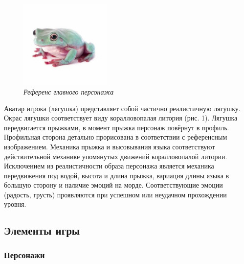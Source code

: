 \documentclass{article}
\begin{document}
\begin{figure}
    \centering
    \includegraphics[width=0.4\textwidth]{pictures/photo_2024-12-01_22-21-33.jpg}
    \caption{\textit {Референс главного персонажа}}
    \label{fig:example}
\end{figure} 
Аватар игрока (лягушка) представляет собой частично реалистичную лягушку. Окрас лягушки соответствует виду коралловопалая литория (рис. 1).  Лягушка передвигается прыжками, в  момент прыжка персонаж повёрнут в профиль. Профильная сторона детально прорисована в соответствии с референсным изображением. Механика прыжка и высовывания языка соответствуют действительной механике упомянутых движений коралловопалой литории. Исключением из реалистичности образа персонажа является механика передвижения под водой, высота и длина прыжка, вариация длины языка в большую сторону и наличие эмоций на морде. Соответствующие эмоции (радость, грусть) проявляются при успешном или неудачном прохождении уровня.

\subsection{Элементы игры}
\subsubsection{Персонажи}
\end{document}
